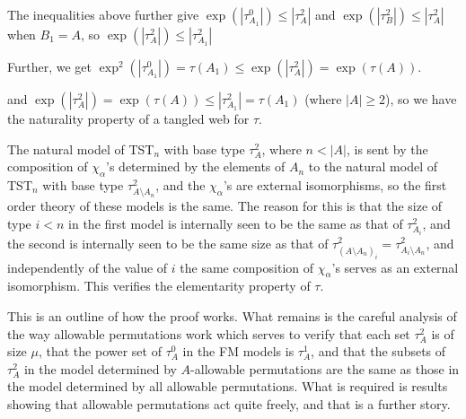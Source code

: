 \documentclass{slides}
\begin{document}
\begin{slide}

The inequalities above further give $\exp(|\tau^0_{A_1}|) \leq |\tau^2_A|$ and $\exp(|\tau^2_B|) \leq |\tau^2_A|$ when $B_1=A$, so $\exp(|\tau^2_{A}|) \leq |\tau^2_{A_1}|$

Further, we get $\exp^2(|\tau^0_{A_1}|) = \tau(A_1) \leq \exp(|\tau^2_A|) = \exp(\tau(A))$.

and $\exp(|\tau^2_{A}|) = \exp(\tau(A)) \leq |\tau^2_{A_1}| = \tau(A_1)$ (where $|A| \geq 2$), so we have the naturality property of a tangled web for $\tau$.

\end{slide}

\begin{slide}

The natural model of TST$_n$ with base type $\tau^2_A$, where $n <  |A|$, is sent by the composition of $\chi_\alpha$'s determined by the elements of $A_n$
to the natural model of TST$_n$ with base type $\tau^2_{A \setminus A_n}$, and the $\chi_\alpha$'s are external isomorphisms, so the first order theory of these models is the same.
The reason for this is that the size of type $i<n$ in the first model is internally seen to be the same as that of $\tau^2_{A_i}$, and the second is internally seen to be the same size
as that of $\tau^2_{(A \setminus A_n)_i} = \tau^2_{A_i \setminus A_n}$, and independently of the value of $i$ the same composition of $\chi_\alpha$'s serves as an external isomorphism.
This verifies the elementarity property of $\tau$.

\end{slide}

\begin{slide}

This is an outline of how the proof works.  What remains is the careful analysis of the way allowable permutations work which serves to verify that
each set $\tau^2_A$ is of size $\mu$, that the power set of $\tau^0_A$ in the FM models is $\tau^1_A$,  and that the subsets of $\tau^2_A$ in the model determined by $A$-allowable permutations are the same as those in the model
determined by all allowable permutations.  What is required is results showing that allowable permutations act quite freely, and that is a further story.

\end{slide}
\end{document}
